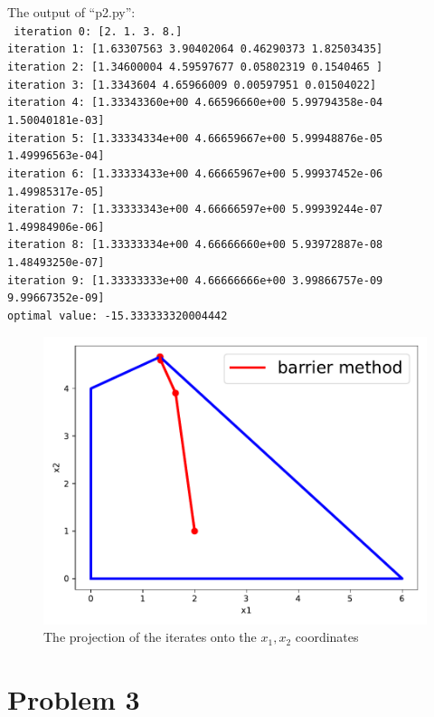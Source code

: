 \documentclass{article}
\begin{document}
\begin{enumerate}[(a)]
		The output of ``p2.py'':\\
		\texttt{
			iteration 0: [2. 1. 3. 8.]\\
			iteration 1: [1.63307563 3.90402064 0.46290373 1.82503435]\\
			iteration 2: [1.34600004 4.59597677 0.05802319 0.1540465 ]\\
			iteration 3: [1.3343604  4.65966009 0.00597951 0.01504022]\\
			iteration 4: [1.33343360e+00 4.66596660e+00 5.99794358e-04 1.50040181e-03]\\
			iteration 5: [1.33334334e+00 4.66659667e+00 5.99948876e-05 1.49996563e-04]\\
			iteration 6: [1.33333433e+00 4.66665967e+00 5.99937452e-06 1.49985317e-05]\\
			iteration 7: [1.33333343e+00 4.66666597e+00 5.99939244e-07 1.49984906e-06]\\
			iteration 8: [1.33333334e+00 4.66666660e+00 5.93972887e-08 1.48493250e-07]\\
			iteration 9: [1.33333333e+00 4.66666666e+00 3.99866757e-09 9.99667352e-09]\\
			optimal value: -15.333333320004442
		}
		\begin{figure}[H]
			\centering
			\includegraphics[width=0.6\linewidth]{p2.pdf}
			\caption{The projection of the iterates onto the $x_1,x_2$ coordinates}
		\end{figure}
\end{enumerate}

\section*{Problem 3}
\end{document}
